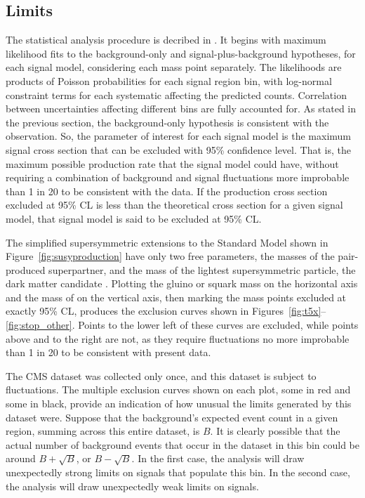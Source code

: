   \subsection{Limits} \label{sec:MT2limits}

  The \CL statistical analysis procedure is decribed in \cite{CLS_method}.
  It begins with maximum likelihood fits to the background-only and signal-plus-background hypotheses, for each signal model, considering each mass point separately. 
  The likelihoods are products of Poisson probabilities for each signal region bin, with log-normal constraint terms for each systematic affecting the predicted counts.
  Correlation between uncertainties affecting different bins are fully accounted for.
  As stated in the previous section, the background-only hypothesis is consistent with the observation.
  So, the parameter of interest for each signal model is the maximum signal cross section that can be excluded with 95\% confidence level.
  That is, the maximum possible production rate that the signal model could have, without requiring a combination of background and signal fluctuations more improbable than 1 in 20 to be consistent with the data.
  If the production cross section excluded at 95\% CL is less than the theoretical cross section for a given signal model, that signal model is said to be excluded at 95\% CL.

  The simplified supersymmetric extensions to the Standard Model shown in Figure~\ref{fig:susyproduction} have only two free parameters, the masses of the pair-produced superpartner, and the mass of the lightest supersymmetric particle, the dark matter candidate \lsp.
  Plotting the gluino or squark mass on the horizontal axis and the mass of \lsp on the vertical axis, then marking the mass points excluded at exactly 95\% CL, produces the exclusion curves shown in Figures~\ref{fig:t5x}--\ref{fig:stop_other}.
  Points to the lower left of these curves are excluded, while points above and to the right are not, as they require fluctuations no more improbable than 1 in 20 to be consistent with present data.

  The CMS dataset was collected only once, and this dataset is subject to fluctuations.
  The multiple exclusion curves shown on each plot, some in red and some in black, provide an indication of how unusual the limits generated by this dataset were.
  Suppose that the background's expected event count in a given region, summing across this entire dataset, is $B$.
  It is clearly possible that the actual number of background events that occur in the dataset in this bin could be around $B+\sqrt{B}$, or $B-\sqrt{B}$.
  In the first case, the analysis will draw unexpectedly strong limits on signals that populate this bin.
  In the second case, the analysis will draw unexpectedly weak limits on signals.

